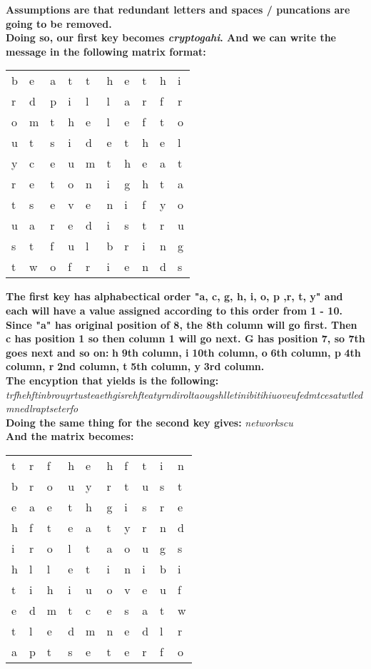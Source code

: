 \documentclass[12pt]{article}
\begin{document}
\begin{enumerate}
  \textbf{Assumptions are that redundant letters and spaces / puncations are going to be removed.} \\
  \textbf{Doing so, our first key becomes \textit{cryptogahi}. And we can write the message in the following matrix format:}
  \begin{tabular}{llllllllll}
    b & e & a & t & t & h & e & t & h & i \\
    r & d & p & i & l & l & a & r & f & r \\
    o & m & t & h & e & l & e & f & t & o \\
    u & t & s & i & d & e & t & h & e & l \\
    y & c & e & u & m & t & h & e & a & t \\
    r & e & t & o & n & i & g & h & t & a \\
    t & s & e & v & e & n & i & f & y & o \\
    u & a & r & e & d & i & s & t & r & u \\
    s & t & f & u & l & b & r & i & n & g \\
    t & w & o & f & r & i & e & n & d & s
  \end{tabular}

  \textbf{The first key has alphabectical order "a, c, g, h, i, o, p ,r, t, y" and each will have a value assigned according to this order from 1 - 10.}
  \textbf{Since "a" has original position of 8, the 8th column will go first. Then c has position 1 so then column 1 will go next. G has position 7, so 7th goes next and so on:}
  \textbf{h} \rightarrow \textbf{9th column, i} \rightarrow \textbf{10th column, o} \rightarrow \textbf{6th column, p} \rightarrow \textbf{4th column, r} \rightarrow \textbf{2nd column, t} \rightarrow \textbf{5th column, y} \rightarrow \textbf{3rd column.} \\
  \textbf{The encyption that yields is the following:} \\
  \textit{trfhehftinbrouyrtusteaethgisrehfteatyrndiroltaougshlletinibitihiuoveufedmtcesatwtledmnedlraptseterfo} \\

  \textbf{Doing the same thing for the second key gives:} \textit{networkscu}\\
  \textbf{And the matrix becomes:}
  \begin{tabular}{llllllllll}
    t & r & f & h & e & h & f & t & i & n \\
    b & r & o & u & y & r & t & u & s & t \\
    e & a & e & t & h & g & i & s & r & e \\
    h & f & t & e & a & t & y & r & n & d \\
    i & r & o & l & t & a & o & u & g & s \\
    h & l & l & e & t & i & n & i & b & i \\
    t & i & h & i & u & o & v & e & u & f \\
    e & d & m & t & c & e & s & a & t & w \\
    t & l & e & d & m & n & e & d & l & r \\
    a & p & t & s & e & t & e & r & f & o
  \end{tabular}


\end{enumerate}
\end{document}
